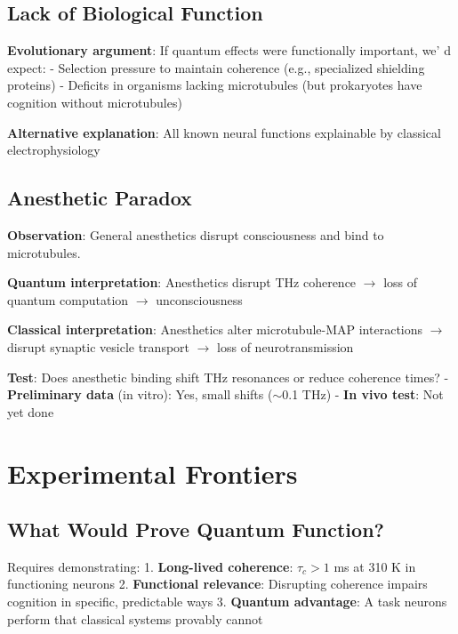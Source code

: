 \subsection{Lack of Biological
Function}\label{lack-of-biological-function}

\textbf{Evolutionary argument}: If quantum effects were functionally
important, we' d expect: - Selection pressure to maintain
coherence (e.g., specialized shielding proteins) - Deficits in organisms
lacking microtubules (but prokaryotes have cognition without
microtubules)

\textbf{Alternative explanation}: All known neural functions explainable
by classical electrophysiology

\subsection{Anesthetic Paradox}\label{anesthetic-paradox}

\textbf{Observation}: General anesthetics disrupt consciousness and bind
to microtubules.

\textbf{Quantum interpretation}: Anesthetics disrupt THz coherence
$\rightarrow$ loss of quantum computation
$\rightarrow$ unconsciousness

\textbf{Classical interpretation}: Anesthetics alter microtubule-MAP
interactions $\rightarrow$ disrupt synaptic vesicle
transport $\rightarrow$ loss of neurotransmission

\textbf{Test}: Does anesthetic binding shift THz resonances or reduce
coherence times? - \textbf{Preliminary data} (in vitro): Yes, small
shifts ($\sim$0.1 THz) - \textbf{In vivo test}: Not yet done

\section{Experimental Frontiers}
\label{sec:experimental-frontiers}

\subsection{What Would Prove Quantum
Function?}\label{what-would-prove-quantum-function}

Requires demonstrating: 1. \textbf{Long-lived coherence}: \(\tau_c > 1\)
ms at 310 K in functioning neurons 2. \textbf{Functional relevance}:
Disrupting coherence impairs cognition in specific, predictable ways 3.
\textbf{Quantum advantage}: A task neurons perform that classical
systems provably cannot

